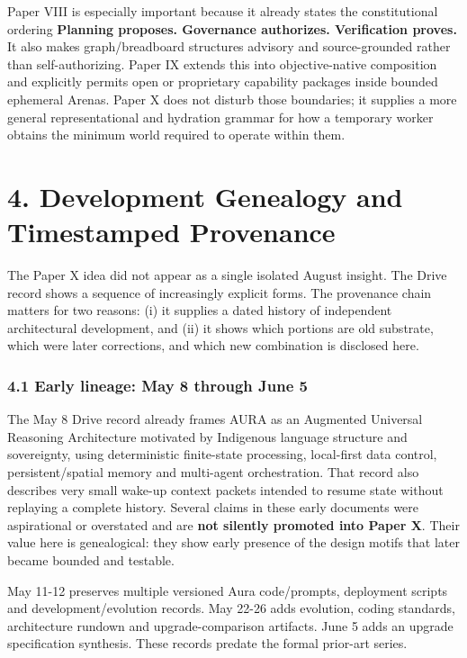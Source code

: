 \documentclass[
  10pt,
  letterpaper,
]{article}
\begin{document}
Paper VIII is especially important because it already states the
constitutional ordering \textbf{Planning proposes. Governance
authorizes. Verification proves.} It also makes graph/breadboard
structures advisory and source-grounded rather than self-authorizing.
Paper IX extends this into objective-native composition and explicitly
permits open or proprietary capability packages inside bounded ephemeral
Arenas. Paper X does not disturb those boundaries; it supplies a more
general representational and hydration grammar for how a temporary
worker obtains the minimum world required to operate within them.

\section{4. Development Genealogy and Timestamped
Provenance}\label{4-development-genealogy-and-timestamped-provenance}

The Paper X idea did not appear as a single isolated August insight. The
Drive record shows a sequence of increasingly explicit forms. The
provenance chain matters for two reasons: (i) it supplies a dated
history of independent architectural development, and (ii) it shows
which portions are old substrate, which were later corrections, and
which new combination is disclosed here.

\subsubsection{4.1 Early lineage: May 8 through June
5}\label{41-early-lineage-may-8-through-june-5}

The May 8 Drive record already frames AURA as an Augmented Universal
Reasoning Architecture motivated by Indigenous language structure and
sovereignty, using deterministic finite-state processing, local-first
data control, persistent/spatial memory and multi-agent orchestration.
That record also describes very small wake-up context packets intended
to resume state without replaying a complete history. Several claims in
these early documents were aspirational or overstated and are
\textbf{not silently promoted into Paper X}. Their value here is
genealogical: they show early presence of the design motifs that later
became bounded and testable.

May 11-12 preserves multiple versioned Aura code/prompts, deployment
scripts and development/evolution records. May 22-26 adds evolution,
coding standards, architecture rundown and upgrade-comparison artifacts.
June 5 adds an upgrade specification synthesis. These records predate
the formal prior-art series.
\end{document}
